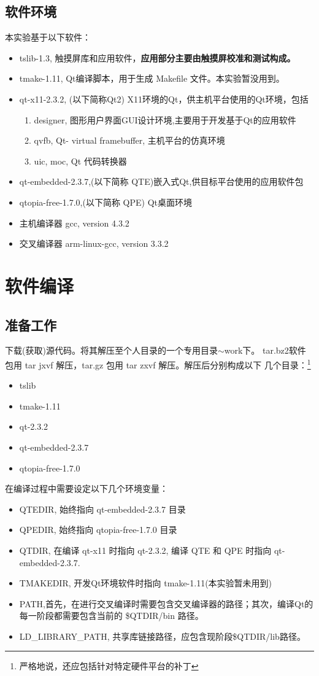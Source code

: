 \documentclass[nofonts]{ctexart}
\begin{document}
\subsection{软件环境}
	本实验基于以下软件：
\begin{itemize}\itemsep=-4pt
  \item tslib-1.3, 触摸屏库和应用软件，\textbf{应用部分主要由触摸屏校准和测试构成。}
  \item tmake-1.11, Qt编译脚本，用于生成 Makefile 文件。本实验暂没用到。
  \item qt-x11-2.3.2, (以下简称Qt2) X11环境的Qt，供主机平台使用的Qt环境，包括
  \begin{enumerate}
	\item designer, 图形用户界面GUI设计环境,主要用于开发基于Qt的应用软件
	\item qvfb, Qt- virtual framebuffer, 主机平台的仿真环境
	\item uic, moc, Qt 代码转换器
  \end{enumerate}
  \item qt-embedded-2.3.7,(以下简称 QTE)嵌入式Qt,供目标平台使用的应用软件包
  \item qtopia-free-1.7.0,(以下简称 QPE) Qt桌面环境
  \item 主机编译器 gcc, version 4.3.2
  \item 交叉编译器 arm-linux-gcc, version 3.3.2
\end{itemize}
\section{软件编译}
\subsection{准备工作}
	下载(获取)源代码。将其解压至个人目录的一个专用目录$\sim$work下。
tar.bz2软件包用 tar jxvf 解压，tar.gz 包用 tar zxvf 解压。解压后分别构成以下
几个目录：\footnote{严格地说，还应包括针对特定硬件平台的补丁}
\begin{itemize}\itemsep=-4pt
  \item tslib
  \item tmake-1.11
  \item qt-2.3.2
  \item qt-embedded-2.3.7
  \item qtopia-free-1.7.0
\end{itemize}
	在编译过程中需要设定以下几个环境变量：
\begin{itemize}\itemsep=-4pt
  \item QTEDIR, 始终指向 qt-embedded-2.3.7 目录
  \item QPEDIR, 始终指向 qtopia-free-1.7.0 目录
  \item QTDIR, 在编译 qt-x11 时指向 qt-2.3.2, 编译 QTE 和 QPE 时指向
		qt-embedded-2.3.7.
  \item TMAKEDIR, 开发Qt环境软件时指向 tmake-1.11(本实验暂未用到)
  \item PATH,首先，在进行交叉编译时需要包含交叉编译器的路径；其次，编译Qt的
		每一阶段都需要包含当前的 \$QTDIR/bin 路径。
  \item LD\_LIBRARY\_PATH, 共享库链接路径，应包含现阶段\$QTDIR/lib路径。
\end{itemize}
\end{document}
